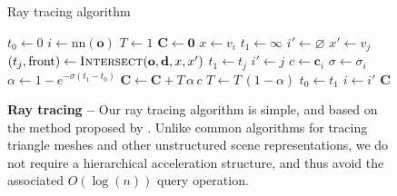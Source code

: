 \begin{figure}[ht]
  \centering
  \begin{algorithm}[H]
    \caption{Ray tracing algorithm}\label{alg:render}
    \begin{algorithmic}[1]
       
        \State \(t_0 \gets 0\)
        \State \(i \gets \mathrm{nn}(\mathbf{o})\) 
        \State \(T \gets 1\)
        \State \(\mathbf{C} \gets \mathbf{0}\)
          \State \(x \gets v_i\) 
          \State \(t_1 \gets \infty\)
          \State \(i' \gets \varnothing\)
            
            \State \(x' \gets v_j\) 
            \State \((t_j, \textrm{front}) \gets \textsc{Intersect}(\mathbf{o},\mathbf{d},x,x')\)
              \State \(t_1 \gets t_j\)
              \State \(i' \gets j\)
            \EndIf
          \EndFor
          \State \(c \gets \mathbf{c}_{i}\) 
          \State \(\sigma \gets \sigma_{i}\) 
          \State \(\alpha \gets 1 - e^{-\sigma(t_1-t_0)}\)
          \State \(\mathbf{C} \gets \mathbf{C} + T\,\alpha\, c\)
          \State \(T \gets T\,(1-\alpha)\)
          \State \(t_0 \gets t_1\)
          \State \(i \gets i'\)
        \EndWhile
        \State \Return \(\mathbf{C}\)
      \EndProcedure
    \end{algorithmic}
  \end{algorithm}
\vspace{-1.5em}
  \caption{\textbf{Ray tracing --}
  Our ray tracing algorithm is simple, and based on the method proposed by \citet{ray_plane}.
  Unlike common algorithms for tracing triangle meshes and other unstructured scene representations, we do not require a hierarchical acceleration structure, and thus avoid the associated $O(\log(n))$ query operation.}
  \label{fig:pseudocode}
\end{figure}